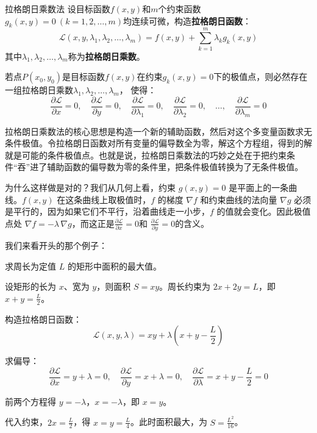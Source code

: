 \begin{definition}{拉格朗日乘数法}{}
  设目标函数$f(x, y)$和$m$个约束函数$g_k(x, y)=0 \ (k=1,2,\dots,m)$均连续可微，构造\textbf{拉格朗日函数}：
  \[
  \mathcal{L}(x, y, \lambda_1, \lambda_2, \dots, \lambda_m)=f(x, y) +\sum_{k=1}^{m} \lambda_k g_k(x, y)
  \]
  其中$\lambda_1, \lambda_2, \dots, \lambda_m$称为\textbf{拉格朗日乘数}。

  若点$P(x_0,y_0)$是目标函数$f(x, y)$在约束$g_k(x, y)=0$下的极值点，则必然存在一组拉格朗日乘数$\lambda_1, \lambda_2, \dots, \lambda_m$，
  使得：
  \[
    \frac{\partial \mathcal{L}}{\partial x}=0, \quad
    \frac{\partial \mathcal{L}}{\partial y}=0, \quad
    \frac{\partial \mathcal{L}}{\partial \lambda_1}=0, \quad
    \frac{\partial \mathcal{L}}{\partial \lambda_2}=0, \quad
    \dots, \quad
    \frac{\partial \mathcal{L}}{\partial \lambda_m}=0
  \]
\end{definition}

拉格朗日乘数法的核心思想是构造一个新的辅助函数，然后对这个多变量函数求无条件极值。令拉格朗日函数对所有变量的偏导数全为零，解这个方程组，得到的解就是可能的条件极值点。也就是说，拉格朗日乘数法的巧妙之处在于把约束条件“吞”进了辅助函数的偏导数为零的条件里，把条件极值转换为了无条件极值。

为什么这样做是对的？我们从几何上看，约束 $g(x, y) = 0$ 是平面上的一条曲线。$f(x, y)$ 在这条曲线上取极值时，$f$ 的梯度 $\nabla f$ 和约束曲线的法向量 $\nabla g$ 必须是平行的，因为如果它们不平行，沿着曲线走一小步，$f$ 的值就会变化。因此极值点处 $\nabla f = -\lambda\, \nabla g$，而这正是$\frac{\partial \mathcal{L}}{\partial x}=0$和
    $\frac{\partial \mathcal{L}}{\partial y}=0$的含义。

我们来看开头的那个例子：

\begin{myexample}
  求周长为定值 $L$ 的矩形中面积的最大值。

  设矩形的长为 $x$、宽为 $y$，则面积 $S = xy$。周长约束为 $2x + 2y = L$，即 $x + y = \frac{L}{2}$。

  构造拉格朗日函数：
  \[
  \mathcal{L}(x, y, \lambda) = xy + \lambda (x + y - \frac{L}{2})
  \]

  求偏导：
  \[
  \frac{\partial \mathcal{L}}{\partial x} = y + \lambda = 0,\quad
  \frac{\partial \mathcal{L}}{\partial y} = x + \lambda = 0,\quad
  \frac{\partial \mathcal{L}}{\partial \lambda} = x + y - \frac{L}{2} = 0
  \]

  前两个方程得 $y = -\lambda$，$x = -\lambda$，即 $x = y$。

  代入约束，$2x = \frac{L}{2}$，得 $x = y = \frac{L}{4}$。此时面积最大，为 $S = \frac{L^2}{16}$。

\end{myexample}

